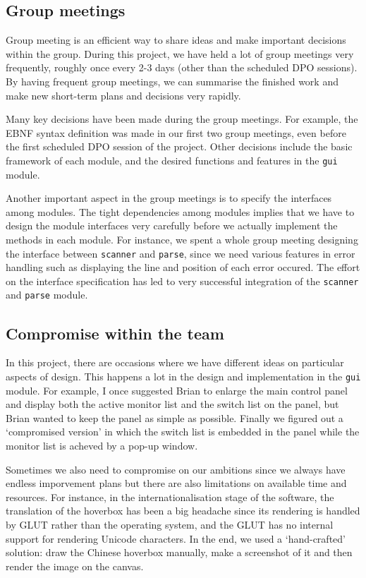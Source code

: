 \documentclass[10pt,a4paper]{article}
\begin{document}
\subsection{Group meetings}
\label{sec:org31411fb}

Group meeting is an efficient way to share ideas and make important
decisions within the group. During this project, we have held a lot of
group meetings very frequently, roughly once every 2-3 days (other
than the scheduled DPO sessions). By having frequent group meetings,
we can summarise the finished work and make new short-term plans and
decisions very rapidly. 

Many key decisions have been made during the group meetings. For
example, the EBNF syntax definition was made in our first two group
meetings, even before the first scheduled DPO session of the project.
Other decisions include the basic framework of each module, and the
desired functions and features in the \texttt{gui} module.

Another important aspect in the group meetings is to specify the
interfaces among modules. The tight dependencies among modules implies
that we have to design the module interfaces very carefully before we
actually implement the methods in each module. For instance, we spent
a whole group meeting designing the interface between \texttt{scanner} and
\texttt{parse}, since we need various features in error handling such as
displaying the line and position of each error occured. The effort on
the interface specification has led to very successful integration of
the \texttt{scanner} and \texttt{parse} module.

\subsection{Compromise within the team}
\label{sec:org7aa4a59}

In this project, there are occasions where we have different ideas on
particular aspects of design. This happens a lot in the design and
implementation in the \texttt{gui} module. For example, I once suggested
Brian to enlarge the main control panel and display both the active
monitor list and the switch list on the panel, but Brian wanted to
keep the panel as simple as possible. Finally we figured out a
`compromised version' in which the switch list is embedded in the
panel while the monitor list is acheved by a pop-up window.

Sometimes we also need to compromise on our ambitions since we always
have endless imporvement plans but there are also limitations on
available time and resources. For instance, in the
internationalisation stage of the software, the translation of the
hoverbox has been a big headache since its rendering is handled by
GLUT rather than the operating system, and the GLUT has no internal
support for rendering Unicode characters. In the end, we used a
`hand-crafted' solution: draw the Chinese hoverbox manually, make a
screenshot of it and then render the image on the canvas.
\end{document}
